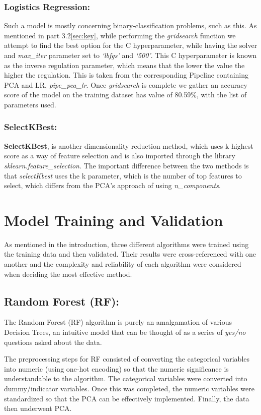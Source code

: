 \documentclass{article}
\begin{document}
\subsubsection{Logistics Regression:}
Such a model is mostly concerning binary-classification problems, such as this. As mentioned in part 3.2\ref{sec:key}, while performing the \textit{gridsearch} function we attempt to find the best option for the C hyperparameter, while having the solver and \textit{max\_iter} parameter set to \textit{‘lbfgs’} and \textit{‘500’}. This C hyperparameter is known as the inverse regulation parameter, which means that the lower the value the higher the regulation. This is taken from the corresponding Pipeline containing PCA and LR\cite{lr}, \textit{pipe\_pca\_lr}. Once \textit{gridsearch} is complete we gather an accuracy score of the model on the training dataset has value of 80.59\%, with the list of parameters used.
\subsubsection{SelectKBest\cite{SelectKBest}:}
\textbf{SelectKBest}, is another dimensionality reduction method, which uses k highest score as a way of feature selection and is also imported through the library \textit{sklearn.feature\_selection}. The important difference between the two methods is that \textit{selectKbest} uses the k parameter, which is the number of top features to select, which differs from the PCA’s approach of using \textit{n\_components}. 

\section{Model Training and Validation}
As mentioned in the introduction, three different algorithms were trained using the training data and then validated. Their results were cross-referenced with one another and the complexity and reliability of each algorithm were considered when deciding the most effective method.
\subsection{Random Forest (RF):}
The Random Forest (RF) algorithm is purely an amalgamation of various Decision Trees\cite{h2o}, an intuitive model that can be thought of as a series of \textit{yes/no} questions asked about the data.

The preprocessing steps for RF consisted of converting the categorical variables into numeric (using one-hot encoding) so that the numeric significance is understandable to the algorithm. The categorical variables were converted into dummy/indicator variables. Once this was completed, the numeric variables were standardized so that the PCA can be effectively implemented. Finally, the data then underwent PCA. 
\end{document}
